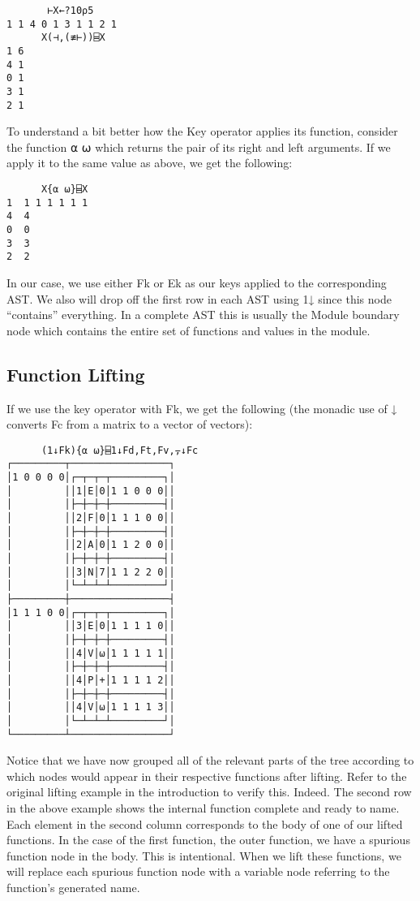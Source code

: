 \documentclass[pldi]{sigplanconf-pldi15}
\begin{document}
\begin{verbatim}
       ⊢X←?10⍴5
1 1 4 0 1 3 1 1 2 1
      X(⊣,(≢⊢))⌸X
1 6
4 1
0 1
3 1
2 1
\end{verbatim}

To understand a bit better how the Key operator applies its function, consider the function {⍺ ⍵} 
which returns the pair of its right and left arguments. If we apply it to the same value as above, we 
get the following:

\begin{verbatim}
      X{⍺ ⍵}⌸X
1  1 1 1 1 1 1 
4  4           
0  0           
3  3           
2  2
\end{verbatim}

In our case, we use either Fk or Ek as our keys applied to the corresponding AST. We also will drop off 
the first row in each AST using 1↓ since this node “contains” everything. In a complete AST this is 
usually the Module boundary node which contains the entire set of functions and values in the module.
\subsection{Function Lifting}

If we use the key operator with Fk, we get the following (the monadic use of ↓ converts Fc from a 
matrix to a vector of vectors):

\begin{verbatim}
      (1↓Fk){⍺ ⍵}⌸1↓Fd,Ft,Fv,⍪↓Fc
┌─────────┬─────────────────┐
│1 0 0 0 0│┌─┬─┬─┬─────────┐│
│         ││1│E│0│1 1 0 0 0││
│         │├─┼─┼─┼─────────┤│
│         ││2│F│0│1 1 1 0 0││
│         │├─┼─┼─┼─────────┤│
│         ││2│A│0│1 1 2 0 0││
│         │├─┼─┼─┼─────────┤│
│         ││3│N│7│1 1 2 2 0││
│         │└─┴─┴─┴─────────┘│
├─────────┼─────────────────┤
│1 1 1 0 0│┌─┬─┬─┬─────────┐│
│         ││3│E│0│1 1 1 1 0││
│         │├─┼─┼─┼─────────┤│
│         ││4│V│⍵│1 1 1 1 1││
│         │├─┼─┼─┼─────────┤│
│         ││4│P│+│1 1 1 1 2││
│         │├─┼─┼─┼─────────┤│
│         ││4│V│⍵│1 1 1 1 3││
│         │└─┴─┴─┴─────────┘│
└─────────┴─────────────────┘
\end{verbatim}

Notice that we have now grouped all of the relevant parts of the tree according to which nodes would 
appear in their respective functions after lifting. Refer to the original lifting example in the 
introduction to verify this. Indeed. The second row in the above example shows the internal function 
complete and ready to name. Each element in the second column corresponds to the body of one of our 
lifted functions. In the case of the first function, the outer function, we have a spurious function node 
in the body. This is intentional. When we lift these functions, we will replace each spurious function 
node with a variable node referring to the function’s generated name. 
\end{document}
